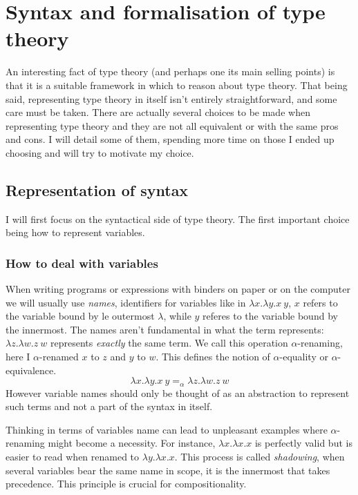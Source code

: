 \chapter{Syntax and formalisation of type theory}

An interesting fact of type theory (and perhaps one its main selling points) is
that it is a suitable framework in which to reason about type theory.
That being said, representing type theory in itself isn't entirely
straightforward, and some care must be taken. There are actually several choices
to be made when representing type theory and they are not all equivalent or with
the same pros and cons.
I will detail some of them, spending more time on those I ended up choosing
and will try to motivate my choice.

\section{Representation of syntax}

I will first focus on the syntactical side of type theory.
The first important choice being how to represent variables.

\subsection{How to deal with variables}

When writing programs or expressions with binders on paper or on the computer
we will usually use \emph{names}, identifiers for variables like in
\(\lambda x. \lambda y. x\ y\), \(x\) refers to the variable bound by le
outermost \(\lambda\), while \(y\) referes to the variable bound by the
innermost.
The names aren't fundamental in what the term represents:
\(\lambda z. \lambda w. z\ w\) represents \emph{exactly} the same term.
We call this operation \(\alpha\)-renaming, here I \(\alpha\)-renamed \(x\)
to \(z\) and \(y\) to \(w\). This defines the notion of \(\alpha\)-equality
or \(\alpha\)-equivalence.
\[
  \lambda x. \lambda y. x\ y =_\alpha \lambda z. \lambda w. z\ w
\]
However variable names should only be thought of as an abstraction to represent
such terms and not a part of the syntax in itself.

Thinking in terms of variables name can lead to unpleasant examples where
\(\alpha\)-renaming might become a necessity.
For instance, \(\lambda x. \lambda x. x\) is perfectly valid but is easier to
read when renamed to \(\lambda y. \lambda x. x\). This process is called
\emph{shadowing}, when several variables bear the same name in scope, it is the
innermost that takes precedence. This principle is crucial for compositionality.

